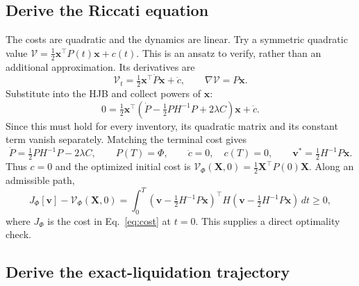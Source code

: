 \subsection*{Derive the Riccati equation}

The costs are quadratic and the dynamics are linear. Try a symmetric
quadratic value
$\mathcal V=\tfrac12\mathbf x^\top P(t)\mathbf x+c(t)$.
This is an ansatz to verify, rather than an additional approximation.
Its derivatives are
\[
 \mathcal V_t=\tfrac12\mathbf x^\top\dot P\mathbf x+\dot c,
 \qquad\nabla\mathcal V=P\mathbf x.
\]
Substitute into the HJB and collect powers of $\mathbf x$:
\[
 0=\tfrac12\mathbf x^\top
 \left(\dot P-\tfrac12PH^{-1}P+2\lambda C\right)\mathbf x+\dot c.
\]
Since this must hold for every inventory, its quadratic matrix and its
constant term vanish separately. Matching the terminal cost gives
\begin{equation}
 \dot P=\tfrac12PH^{-1}P-2\lambda C,\qquad P(T)=\Phi,
 \qquad\dot c=0,\quad c(T)=0,
 \qquad\mathbf v^*=\tfrac12H^{-1}P\mathbf x.
 \label{eq:ric}
\end{equation}
Thus $c=0$ and the optimized initial cost is
$\mathcal V_\Phi(\mathbf X,0)=\tfrac12\mathbf X^\top P(0)\mathbf X$.
Along an admissible path,
\[
 J_\Phi[\mathbf v]-\mathcal V_\Phi(\mathbf X,0)
 =\int_0^T(\mathbf v-\tfrac12H^{-1}P\mathbf x)^\top
 H(\mathbf v-\tfrac12H^{-1}P\mathbf x)\,dt\ge0,
\]
where $J_\Phi$ is the cost in Eq.~\eqref{eq:cost} at $t=0$.
This supplies a direct optimality check.

\subsection*{Derive the exact-liquidation trajectory}

